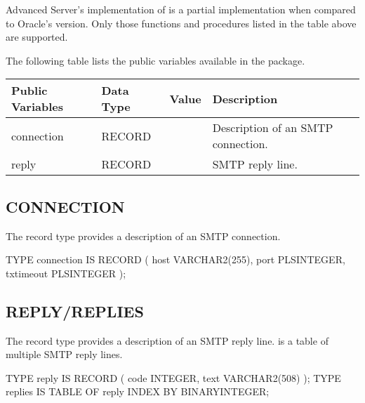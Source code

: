 \documentclass[letterpaper,10pt,english,openany,oneside]{sphinxmanual}
\begin{document}
Advanced Server’s implementation of  is a partial
implementation when compared to Oracle’s version. Only those functions
and procedures listed in the table above are supported.

The following table lists the public variables available in the
 package.


\begin{savenotes}\sphinxattablestart
\centering
\begin{tabulary}{\linewidth}[t]{|T|T|T|T|}
\hline

Public Variables
&
Data Type
&
Value
&
Description
\\
\hline
connection
&
RECORD
&&
Description of an SMTP connection.
\\
\hline
reply
&
RECORD
&&
SMTP reply line.
\\
\hline
\end{tabulary}
\par
\sphinxattableend\end{savenotes}

\newpage


\subsection{CONNECTION}
\label{\detokenize{utl_smtp:connection}}
The  record type provides a description of an SMTP connection.

%
\begin{sphinxVerbatim}[commandchars=\\\{\}]
TYPE connection IS RECORD (
    host            VARCHAR2(255),
    port            PLS\PYGZus{}INTEGER,
    tx\PYGZus{}timeout      PLS\PYGZus{}INTEGER
);
\end{sphinxVerbatim}


\subsection{REPLY/REPLIES}
\label{\detokenize{utl_smtp:reply-replies}}\label{\detokenize{utl_smtp:id1}}
The  record type provides a description of an SMTP reply line.
 is a table of multiple SMTP reply lines.

%
\begin{sphinxVerbatim}[commandchars=\\\{\}]
TYPE reply IS RECORD (
    code            INTEGER,
    text            VARCHAR2(508)
);
TYPE replies IS TABLE OF reply INDEX BY BINARY\PYGZus{}INTEGER;
\end{sphinxVerbatim}
\end{document}

